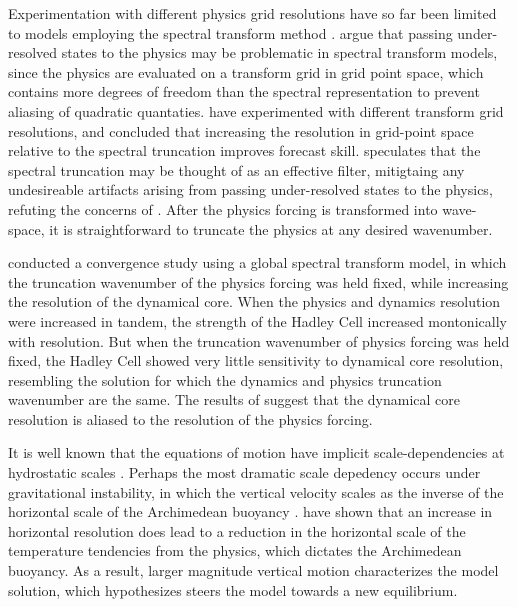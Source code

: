 \documentclass{agujournal}
\begin{document}
Experimentation with different physics grid resolutions have so far been limited to models employing the spectral transform method \citep{LH1997MWR,W1999T,W2014PTRSL}. \cite{LH1997MWR} argue that passing under-resolved states to the physics may be problematic in spectral transform models, since the physics are evaluated on a transform grid in grid point space, which contains more degrees of freedom than the spectral representation to prevent aliasing of quadratic quantaties. \cite{W2014PTRSL} have experimented with different transform grid resolutions, and concluded that increasing the resolution in grid-point space relative to the spectral truncation improves forecast skill. \cite{W2014PTRSL} speculates that the spectral truncation may be thought of as an effective filter, mitigtaing any undesireable artifacts arising from passing under-resolved states to the physics, refuting the concerns of \cite{LH1997MWR}. After the physics forcing is transformed into wave-space, it is straightforward to truncate the physics at any desired wavenumber. 


\cite{W1999T} conducted a convergence study using a global spectral transform model, in which the truncation wavenumber of the physics forcing was held fixed, while increasing the resolution of the dynamical core. When the physics and dynamics resolution were increased in tandem, the strength of the Hadley Cell increased montonically with resolution. But when the truncation wavenumber of physics forcing was held fixed, the Hadley Cell showed very little sensitivity to dynamical core resolution, resembling the solution for which the dynamics and physics truncation wavenumber are the same. The results of \cite{W1999T} suggest that the dynamical core resolution is aliased to the resolution of the physics forcing. 

It is well known that the equations of motion have implicit scale-dependencies at hydrostatic scales \citep{O1981JAS}. Perhaps the most dramatic scale depedency occurs under gravitational instability, in which the vertical velocity scales as the inverse of the horizontal scale of the Archimedean buoyancy \citep{JR2016QJRMS,HR2017JCLIM,HR2018JAMES}. \cite{HR2018JAMES} have shown that an increase in horizontal resolution does lead to a reduction in the horizontal scale of the temperature tendencies from the physics, which dictates the Archimedean buoyancy. As a result, larger magnitude vertical motion characterizes the model solution, which \cite{HR2017JCLIM} hypothesizes steers the model towards a new equilibrium.
\end{document}
